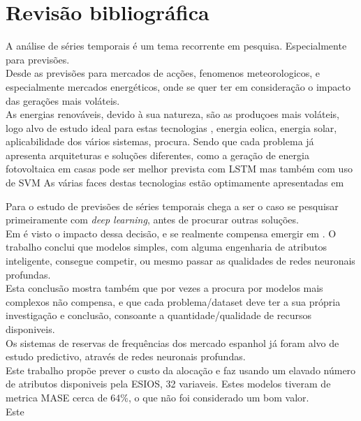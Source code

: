 \chapter{Revisão bibliográfica}

A análise de séries temporais é um tema recorrente em pesquisa. Especialmente para previsões.\\
Desde as previsões para mercados de acções\cite{Bhandari2022}, fenomenos meteorologicos\cite{Wang2019}, e especialmente mercados energéticos, onde se quer ter em consideração o impacto das gerações mais voláteis. \\
As energias renováveis, devido à sua natureza, são as produçoes mais voláteis, logo alvo de estudo ideal para estas tecnologias\cite{Lu2015}
, energia eolica\cite{Sun2022}, energia solar\cite{Rajasundrapandiyanleebanon2023}, aplicabilidade dos vários sistemas\cite{Ahmad2020}, procura\cite{Antonopoulos2020}.
Sendo que cada problema já apresenta arquiteturas e soluções diferentes, como a geração de energia fotovoltaica em casas pode ser melhor prevista com LSTM\cite{Costa2022} mas também com uso de SVM\cite{Meenal2018}
As várias faces destas tecnologias estão optimamente apresentadas em\cite{Benti2023}



Para o estudo de previsões de séries temporais chega a ser o caso se pesquisar primeiramente com \textit{deep learning}, antes de procurar outras soluções.\\
Em \cite{Elsayed} é visto o impacto dessa decisão, e se realmente compensa emergir em . O trabalho conclui que modelos simples, com alguma engenharia de atributos inteligente, consegue competir, ou mesmo passar as qualidades de redes neuronais profundas. \\
Esta conclusão mostra também que por vezes a procura por modelos mais complexos não compensa, e que cada problema/dataset deve ter a sua própria investigação e conclusão, consoante a quantidade/qualidade de recursos disponiveis. \\


Os sistemas de reservas de frequências dos mercado espanhol já foram alvo de estudo predictivo, através de redes neuronais profundas\cite{miota2023}.\\
Este trabalho propõe prever o custo da alocação e faz usando um elavado número de atributos disponiveis pela ESIOS, 32 variaveis. Estes modelos tiveram de metrica MASE cerca de 64\%, o que não foi considerado um bom valor.\\
Este 

